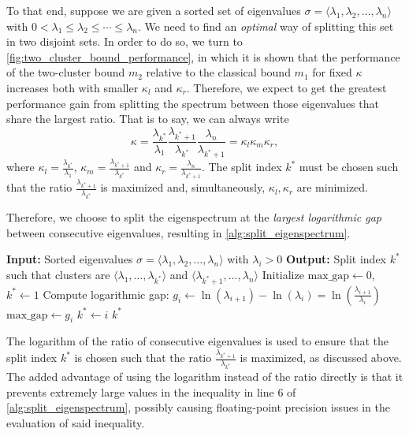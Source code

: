 To that end, suppose we are given a sorted set of eigenvalues $\sigma = \langle\lambda_1, \lambda_2, \ldots, \lambda_n\rangle$ with $0 < \lambda_1 \leq \lambda_2 \leq \cdots \leq \lambda_n$. We need to find an \textit{optimal} way of splitting this set in two disjoint sets. In order to do so, we turn to \cref{fig:two_cluster_bound_performance}, in which it is shown that the performance of the two-cluster bound $m_2$ relative to the classical bound $m_1$ for fixed $\kappa$ increases both with smaller $\kappa_l$ and $\kappa_r$. Therefore, we expect to get the greatest performance gain from splitting the spectrum between those eigenvalues that share the largest ratio. That is to say, we can always write
\[
    \kappa = \frac{\lambda_{k^*}}{\lambda_1}\frac{\lambda_{k^*+1}}{\lambda_{k^*}}\frac{\lambda_n}{\lambda_{k^*+1}} = \kappa_l\kappa_m\kappa_r,
\]
where $\kappa_l = \frac{\lambda_{k^*}}{\lambda_1}$, $\kappa_m = \frac{\lambda_{k^*+1}}{\lambda_{k^*}}$ and $\kappa_r = \frac{\lambda_n}{\lambda_{k^*+1}}$. The split index $k^*$ must be chosen such that the ratio $\frac{\lambda_{k^*+1}}{\lambda_{k^*}}$ is maximized and, simultaneously, $\kappa_l,\kappa_r$ are minimized.

Therefore, we choose to split the eigenspectrum at the \textit{largest logarithmic gap} between consecutive eigenvalues, resulting in \cref{alg:split_eigenspectrum}.
\begin{algorithm}[H]
    \caption{$\operatorname{SplitEigenspectrum}(\sigma)$}
    \begin{algorithmic}[1]
        \State \textbf{Input:} Sorted eigenvalues $\sigma = \langle\lambda_1, \lambda_2, \ldots, \lambda_n\rangle$ with $\lambda_i > 0$
        \State \textbf{Output:} Split index $k^*$ such that clusters are $\langle\lambda_1, \ldots, \lambda_{k^*}\rangle$ and $\langle\lambda_{k^*+1}, \ldots, \lambda_n\rangle$
        \State Initialize $\text{max\_gap} \gets 0$, $k^* \gets 1$
        \State Compute logarithmic gap: $g_i \gets \ln(\lambda_{i+1}) - \ln(\lambda_i) = \ln\left(\frac{\lambda_{i+1}}{\lambda_i}\right)$
        \State $\text{max\_gap} \gets g_i$
        \State $k^* \gets i$
        \EndIf
        \EndFor
        \State \Return $k^*$
    \end{algorithmic}
    \label{alg:split_eigenspectrum}
\end{algorithm}
The logarithm of the ratio of consecutive eigenvalues is used to ensure that the split index $k^*$ is chosen such that the ratio $\frac{\lambda_{k^*+1}}{\lambda_{k^*}}$ is maximized, as discussed above. The added advantage of using the logarithm instead of the ratio directly is that it prevents extremely large values in the inequality in line 6 of \cref{alg:split_eigenspectrum}, possibly causing floating-point precision issues in the evaluation of said inequality.

